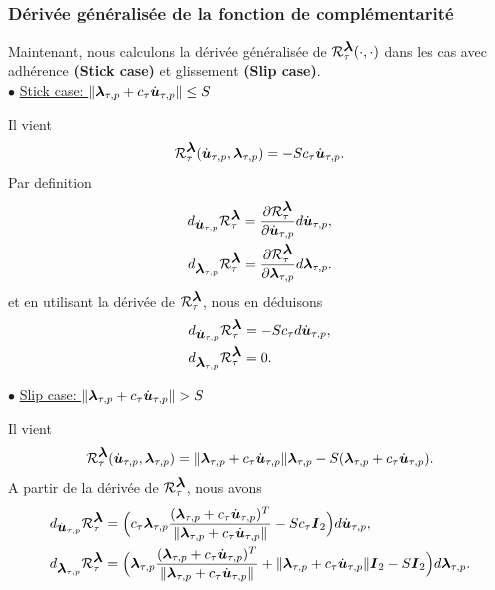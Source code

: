 \subsubsection{Dérivée généralisée de la fonction de complémentarité}\label{gen_deriv}

Maintenant, nous calculons la dérivée généralisée de ${\cal R}_{\tau}^{\blambda} (\cdot,\cdot)$ dans les cas avec adhérence \textbf{(Stick case)} et glissement \textbf{(Slip case)}.\\

$\bullet$ \underline{Stick case: $\|\blambda_{\tau, p}+c_\tau \dot\bu_{\tau, p}\|\le S$}

Il vient
\begin{equation*}
{\cal R}_{\tau}^{\blambda}(\dot\bu_{\tau, p},\blambda_{\tau, p})=- S c_\tau\dot\bu_{\tau, p}.\nonumber
\end{equation*}
Par definition
\begin{align*}
d_{\dot\bu_{\tau, p}} {\cal R}_{\tau}^{\blambda}=\frac{\partial {\cal R}_{\tau}^{\blambda}}{\partial\dot\bu_{\tau, p}}d{\dot\bu_{\tau, p}},\\
d_{\blambda_{\tau, p}} {\cal R}_{\tau}^{\blambda}=\frac{\partial {\cal R}_{\tau}^{\blambda}}{\partial\blambda_{\tau, p}}d{\blambda_{\tau, p}}.
\end{align*}
et en utilisant la dérivée de ${\cal R}_{\tau}^{\blambda}$, nous en déduisons
\begin{align}
&d_{\dot\bu_{\tau, p}} {\cal R}_{\tau}^{\blambda}=- S c_\tau d{\dot\bu_{\tau, p}},\label{C1}\\
&d_{\blambda_{\tau, p}} {\cal R}_{\tau}^{\blambda}=0\label{C2}.
\end{align}

$\bullet$ \underline{Slip case: $\|\blambda_{\tau, p}+c_\tau \dot\bu_{\tau, p}\|> S$} 

Il vient
\begin{equation*}
{\cal R}_{\tau}^{\blambda}(\dot\bu_{\tau, p},\blambda_{\tau, p})=\|\blambda_{\tau, p}+c_\tau \dot\bu_{\tau, p}\|\blambda_{\tau, p}- S (\blambda_{\tau, p}+c_\tau \dot\bu_{\tau, p}).
\end{equation*}
A partir de la dérivée de ${\cal R}_{\tau}^{\blambda}$, nous avons
\begin{align}
&d_{\dot\bu_{\tau, p}} {\cal R}_{\tau}^{\blambda}=\Big(c_{\tau}\blambda_{\tau, p}\frac{(\blambda_{\tau, p}+c_\tau \dot\bu_{\tau, p})^T}{\|\blambda_{\tau, p}+c_\tau \dot\bu_{\tau, p}\|}  - S c_\tau \bI_2\Big) d{\dot\bu_{\tau, p}}\label{C3},\\
&d_{\blambda_{\tau, p}} {\cal R}_{\tau}^{\blambda}=\Big(\blambda_{\tau, p}\frac{(\blambda_{\tau, p}+c_\tau \dot\bu_{\tau, p})^T}{\|\blambda_{\tau, p}+c_\tau \dot\bu_{\tau, p}\|} +\|\blambda_{\tau, p}+c_\tau \dot\bu_{\tau, p}\|\bI_2 - S \bI_2\Big) d{\blambda_{\tau, p}}\label{C4}.
\end{align}

